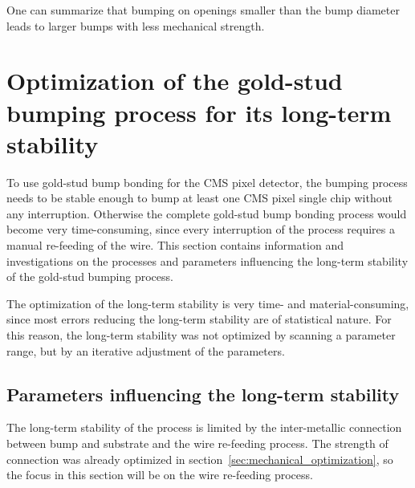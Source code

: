 One can summarize that bumping on openings smaller than the bump diameter leads to larger bumps with less mechanical strength.

\section{Optimization of the gold-stud bumping process for its long-term stability}\label{sec:long-term_stability}
To use gold-stud bump bonding for the \ac{CMS} pixel detector, the bumping process needs to be stable enough to bump at least one \ac{CMS} pixel single chip without any interruption. Otherwise the complete gold-stud bump bonding process would become very time-consuming, since every interruption of the process requires a manual re-feeding of the wire. This section contains information and investigations on the processes and parameters influencing the long-term stability of the gold-stud bumping process.

The optimization of the long-term stability is very time- and material-consuming, since most errors reducing the long-term stability are of statistical nature. For this reason, the long-term stability was not optimized by scanning a parameter range, but by an iterative adjustment of the parameters.


\subsection{Parameters influencing the long-term stability}
The long-term stability of the process is limited by the inter-metallic connection between bump and substrate and the wire re-feeding process. The strength of connection was already optimized in section~\ref{sec:mechanical_optimization}, so the focus in this section will be on the wire re-feeding process.

